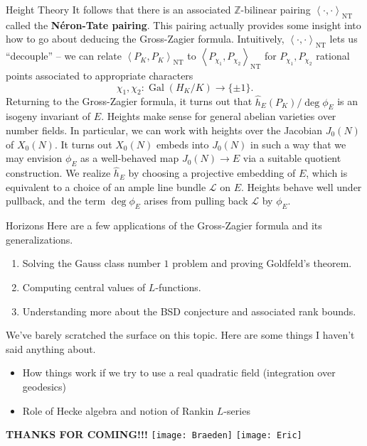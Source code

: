 \documentclass[aspectratio=1610]{beamer}
\newcommand{\Z}{\mathbb{Z}}
\newcommand{\ip}[1]{\left\langle#1\right\rangle}
\DeclareMathOperator{\Gal}{Gal}
\begin{document}
\begin{frame}{Height Theory}
It follows that there is an associated $\Z$-bilinear pairing $\ip{\cdot,\cdot}_{\textrm{NT}}$ called the \textbf{N\'{e}ron-Tate pairing}. This pairing actually provides some insight into how to go about deducing the Gross-Zagier formula. Intuitively, $\ip{\cdot,\cdot}_{\textrm{NT}}$ lets us ``decouple'' -- we can relate $\ip{P_K,P_K}_{\textrm{NT}}$ to $\ip{P_{\chi_1},P_{\chi_2}}_{\textrm{NT}}$ for $P_{\chi_1},P_{\chi_2}$ rational points associated to appropriate characters 
$$\chi_1,\chi_2: \Gal(H_K/K)\to\{\pm1\}.$$
Returning to the Gross-Zagier formula, it turns out that $\hat{h}_E(P_K)/\deg\phi_E$ is an isogeny invariant of $E$. Heights make sense for general abelian varieties over number fields. In particular, we can work with heights over the Jacobian $J_0(N)$ of $X_0(N)$. It turns out $X_0(N)$ embeds into $J_0(N)$ in such a way that we may envision $\phi_E$ as a well-behaved map $J_0(N)\to E$ via a suitable quotient construction. We realize $\hat{h}_E$ by choosing a projective embedding of $E$, which is equivalent to a choice of an ample line bundle $\mathscr{L}$ on $E$. Heights behave well under pullback, and the term $\deg\phi_E$ arises from pulling back $\mathscr{L}$ by $\phi_E$.
\end{frame}

\begin{frame}{Horizons}
Here are a few applications of the Gross-Zagier formula and its generalizations.
\begin{enumerate}
\item Solving the Gauss class number $1$ problem and proving Goldfeld's theorem.
\item Computing central values of $L$-functions.
\item Understanding more about the BSD conjecture and associated rank bounds.
\end{enumerate}
We've barely scratched the surface on this topic. Here are some things I haven't said anything about.
\begin{itemize}
\item How things work if we try to use a real quadratic field (integration over geodesics)
\item Role of Hecke algebra and notion of Rankin $L$-series
\end{itemize}
\end{frame}

\begin{frame}
\begin{center}
\LARGE{\textbf{\qquad THANKS FOR COMING!!!}\vspace{1em}}
\newline
\texttt{[image: Braeden]}
\qquad
\texttt{[image: Eric]}
\end{center}
\end{frame}
\end{document}
